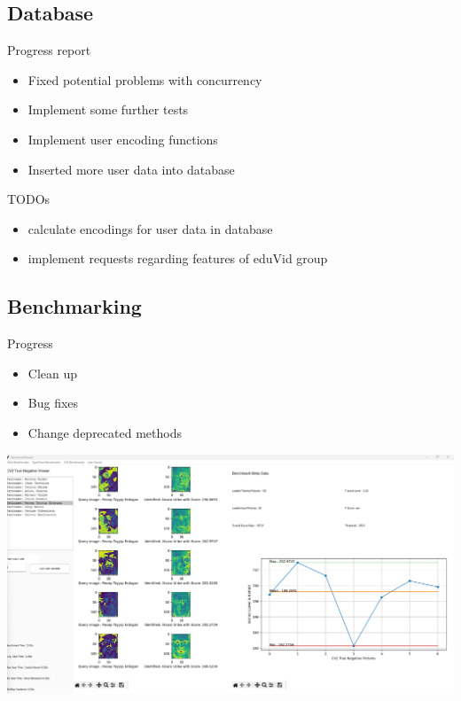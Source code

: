 \documentclass[xcolor=x11names,table]{beamer}
\begin{document}
\subsection{Database}
\begin{frame}{Progress report}
\begin{itemize}
    \item Fixed potential problems with concurrency
    \item Implement some further tests
    \item Implement user encoding functions
    \item Inserted more user data into database
\end{itemize}
\end{frame}

\begin{frame}{TODOs}
\begin{itemize}
    \item calculate encodings for user data in database
    \item implement requests regarding features of eduVid group
\end{itemize}
\end{frame}

\subsection{Benchmarking}
\begin{frame}{Progress}
\begin{itemize}
    \item Clean up
    \item Bug fixes 
    \item Change deprecated methods
\end{itemize}
\begin{center}
\includegraphics[scale=0.25]{images/benchmarking.png}
\end{center}
\end{frame}
\end{document}
